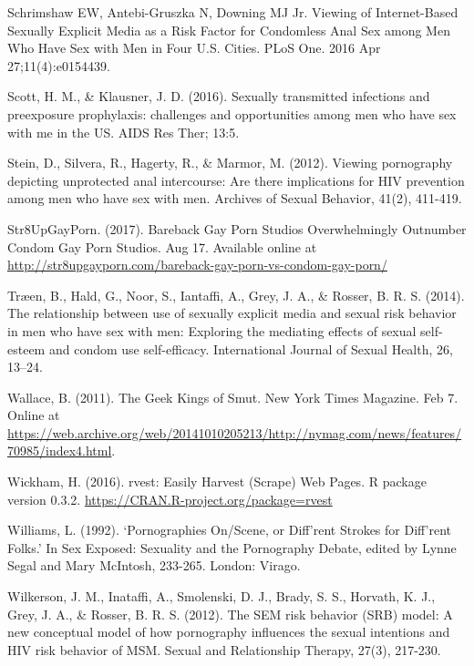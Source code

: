 \documentclass[]{article}
\begin{document}
Schrimshaw EW, Antebi-Gruszka N, Downing MJ Jr. Viewing of
Internet-Based Sexually Explicit Media as a Risk Factor for Condomless
Anal Sex among Men Who Have Sex with Men in Four U.S. Cities. PLoS One.
2016 Apr 27;11(4):e0154439.

Scott, H. M., \& Klausner, J. D. (2016). Sexually transmitted infections
and preexposure prophylaxis: challenges and opportunities among men who
have sex with me in the US. AIDS Res Ther; 13:5.

Stein, D., Silvera, R., Hagerty, R., \& Marmor, M. (2012). Viewing
pornography depicting unprotected anal intercourse: Are there
implications for HIV prevention among men who have sex with men.
Archives of Sexual Behavior, 41(2), 411-419.

Str8UpGayPorn. (2017). Bareback Gay Porn Studios Overwhelmingly
Outnumber Condom Gay Porn Studios. Aug 17. Available online at
\url{http://str8upgayporn.com/bareback-gay-porn-vs-condom-gay-porn/}

Træen, B., Hald, G., Noor, S., Iantaffi, A., Grey, J. A., \& Rosser, B.
R. S. (2014). The relationship between use of sexually explicit media
and sexual risk behavior in men who have sex with men: Exploring the
mediating effects of sexual self-esteem and condom use self-efficacy.
International Journal of Sexual Health, 26, 13--24.

Wallace, B. (2011). The Geek Kings of Smut. New York Times Magazine. Feb
7. Online at
\url{https://web.archive.org/web/20141010205213/http://nymag.com/news/features/70985/index4.html}.

Wickham, H. (2016). rvest: Easily Harvest (Scrape) Web Pages. R package
version 0.3.2. \url{https://CRAN.R-project.org/package=rvest}

Williams, L. (1992). `Pornographies On/Scene, or Diff'rent Strokes for
Diff'rent Folks.' In Sex Exposed: Sexuality and the Pornography Debate,
edited by Lynne Segal and Mary McIntosh, 233-265. London: Virago.

Wilkerson, J. M., Inataffi, A., Smolenski, D. J., Brady, S. S., Horvath,
K. J., Grey, J. A., \& Rosser, B. R. S. (2012). The SEM risk behavior
(SRB) model: A new conceptual model of how pornography influences the
sexual intentions and HIV risk behavior of MSM. Sexual and Relationship
Therapy, 27(3), 217-230.
\end{document}
